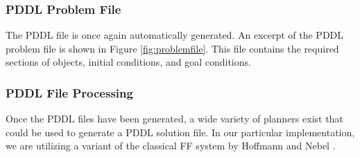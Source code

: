 
\subsubsection{PDDL Problem File}
The PDDL file is once again automatically generated. An excerpt of the PDDL problem file is shown in Figure \ref{fig:problemfile}. This file
contains the required sections of objects, initial conditions, and goal conditions.

\subsubsection{PDDL File Processing}
Once the PDDL files have been generated, a wide variety of planners exist that could be used to generate a PDDL solution file. In our particular implementation, we are utilizing a variant of the classical FF system by Hoffmann and Nebel \cite{Hoffmann2001}.



